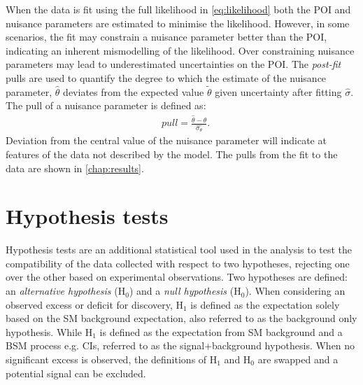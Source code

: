 When the data is fit using the full likelihood in \cref{eq:likelihood} both the POI and nuisance parameters are estimated to minimise the likelihood. However, in some scenarios, the fit may constrain a nuisance parameter better than the POI, indicating an inherent mismodelling of the likelihood. Over constraining nuisance parameters may lead to underestimated uncertainties on the POI. The \emph{post-fit} pulls are used to quantify the degree to which the estimate of the nuisance parameter, $\hat{\theta}$ deviates from the expected value $\tilde{\theta}$ given uncertainty after fitting $\hat{\sigma}$. The pull of a nuisance parameter is defined as: 
\begin{equation}
    \label{eq:nppull}
    \begin{aligned}
        & pull = \frac{\hat{\theta} -{\theta}}{\hat{\sigma_\theta}}.
    \end{aligned}
\end{equation}
Deviation from the central value of the nuisance parameter will indicate at features of the data not described by the model. The pulls from the fit to the data are shown in \cref{chap:results}. 

\section{Hypothesis tests}
Hypothesis tests are an additional statistical tool used in the analysis to test the compatibility of the data collected with respect to two hypotheses, rejecting one over the other based on experimental observations. Two hypotheses are defined: an \emph{alternative hypothesis} ($\mathrm{H_0}$) and a \emph{null hypothesis} ($\mathrm{H_0}$). When considering an observed excess or deficit for discovery, $\mathrm{H_1}$ is defined as the expectation solely based on the SM background expectation, also referred to as the background only hypothesis. While $\mathrm{H_1}$ is defined as the expectation from SM background and a BSM process e.g. CIs, referred to as the signal+background hypothesis. When no significant excess is observed, the definitions of $\mathrm{H_1}$ and $\mathrm{H_0}$ are swapped and a potential signal can be excluded. 

